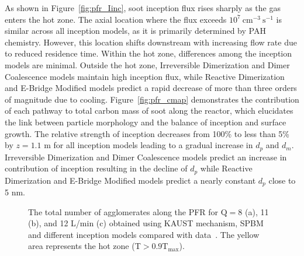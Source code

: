 As shown in Figure~\ref{fig:pfr_Iinc}, soot inception flux rises sharply as the gas enters the hot zone. The axial location where the flux exceeds $10^7~\mathrm{cm^{-3}~s^{-1}}$ is similar across all inception models, as it is primarily determined by PAH chemistry. However, this location shifts downstream with increasing flow rate due to reduced residence time. Within the hot zone, differences among the inception models are minimal. Outside the hot zone, Irreversible Dimerization and Dimer Coalescence models maintain high inception flux, while Reactive Dimerization and E-Bridge Modified models predict a rapid decrease of more than three orders of magnitude due to cooling. Figure~\ref{fig:pfr_cmap} demonstrates the contribution of each pathway to total carbon mass of soot along the reactor, which elucidates the link between particle morphology and the balance of inception and surface growth. The relative strength of inception decreases from 100\% to less than 5\% by $z=1.1$ m for all inception models leading to a gradual increase in $d_p$ and $d_m$. Irreversible Dimerization and Dimer Coalescence models predict an increase in contribution of inception resulting in the decline of $d_p$ while Reactive Dimerization and E-Bridge Modified models predict a nearly constant $d_p$ close to 5 nm.

\begin{figure}[H]
	\centering
	\caption{The total number of agglomerates along the PFR for $\mathrm{Q}=8$ (a), 11 (b), and 12 L/min (c) obtained using KAUST mechanism, SPBM and different inception models compared with data~\citep{mei2019quantitative}. The yellow area represents the hot zone (T$>0.9\mathrm{T_{max}}$).}
	\label{fig:pfr_Nagg} 
\end{figure}

